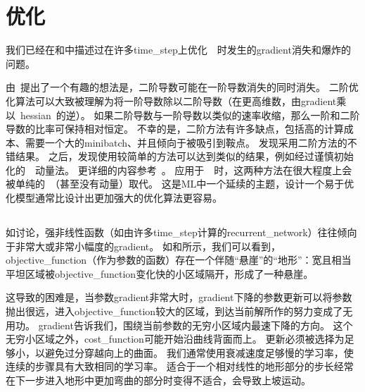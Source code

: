 \section{优化}
\label{sec:optimization_for_long_term_dependencies}
我们已经在和中描述过在许多\gls{time_step}上优化~~时发生的\gls{gradient}消失和爆炸的问题。

由~\cite{Martens-Sutskever-2011}提出了一个有趣的想法是，二阶导数可能在一阶导数消失的同时消失。
二阶优化算法可以大致被理解为将一阶导数除以二阶导数（在更高维数，由\gls{gradient}乘以~\gls{hessian}~的逆）。
如果二阶导数与一阶导数以类似的速率收缩，那么一阶和二阶导数的比率可保持相对恒定。
不幸的是，二阶方法有许多缺点，包括高的计算成本、需要一个大的\gls{minibatch}、并且倾向于被吸引到鞍点。
\cite{Martens-Sutskever-2011}发现采用二阶方法的不错结果。
之后，\cite{Sutskever-et-al-2013}发现使用较简单的方法可以达到类似的结果，例如经过谨慎初始化的~~动量法。
更详细的内容参考~\cite{Sutskever-2012}。
应用于~~时，这两种方法在很大程度上会被单纯的~（甚至没有动量）取代。
这是\gls{ML}中一个延续的主题，设计一个易于优化模型通常比设计出更加强大的优化算法更容易。


\subsection{}
\label{sec:clipping_gradients}
如讨论，强非线性函数（如由许多\gls{time_step}计算的\gls{recurrent_network}）往往倾向于非常大或非常小幅度的\gls{gradient}。
如和所示，我们可以看到，\gls{objective_function}（作为参数的函数）存在一个伴随``悬崖''的``地形''：宽且相当平坦区域被\gls{objective_function}变化快的小区域隔开，形成了一种悬崖。

这导致的困难是，当参数\gls{gradient}非常大时，\gls{gradient}下降的参数更新可以将参数抛出很远，进入\gls{objective_function}较大的区域，到达当前解所作的努力变成了无用功。
\gls{gradient}告诉我们，围绕当前参数的无穷小区域内最速下降的方向。
这个无穷小区域之外，\gls{cost_function}可能开始沿曲线背面而上。
更新必须被选择为足够小，以避免过分穿越向上的曲面。
我们通常使用衰减速度足够慢的学习率，使连续的步骤具有大致相同的学习率。
适合于一个相对线性的地形部分的步长经常在下一步进入地形中更加弯曲的部分时变得不适合，会导致上坡运动。

